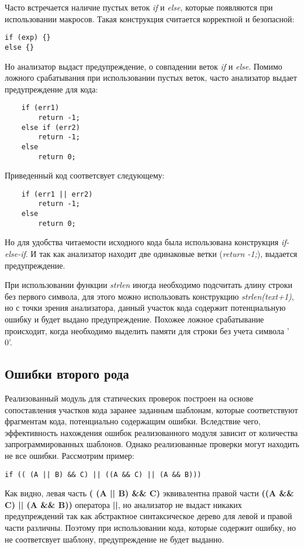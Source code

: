 Часто встречается наличие пустых веток \textit{if} и \textit{else}, которые появляются при использовании
макросов. Такая конструкция считается корректной и безопасной:
\begin{lstlisting}
if (exp) {} 
else {}
\end{lstlisting}
Но анализатор выдаст предупреждение, о совпадении веток \textit{if} и \textit{else}. Помимо 
ложного срабатывания при использовании пустых веток, часто анализатор выдает предупреждение для
кода:
\begin{lstlisting}
	if (err1)
		return -1;
	else if (err2)
		return -1;
	else
		return 0;
\end{lstlisting}
Приведенный код соответсвует следующему:
\begin{lstlisting}
	if (err1 || err2)
		return -1;
	else
		return 0;
\end{lstlisting}
Но для удобства читаемости исходного кода была использована конструкция \textit{if-else-if}. И так как
анализатор находит две одинаковые ветки (\textit{return -1;}), выдается предупреждение.
	
При использовании функции \textit{strlen} иногда необходимо подсчитать длину строки без первого
символа, для этого можно использовать конструкцию \textit{strlen(text+1)}, но с точки зрения анализатора,
данный участок кода содержит потенциальную ошибку и будет выдано предупреждение. Похожее ложное 
срабатывание происходит, когда необходимо выделить памяти для строки без учета символа '\\0'. 
	
\subsection*{Ошибки второго рода}
Реализованный модуль для статических проверок построен на основе сопоставления участков кода заранее
заданным шаблонам, которые соответствуют фрагментам кода, потенциально содержащим ошибки.
Вследствие чего, эффективность нахождения ошибок реализованного модуля зависит от количества запрограммированных шаблонов.
Однако реализованные проверки могут находить не все ошибки. Рассмотрим пример:
\begin{lstlisting}
if (( (A || B) && C) || ((A && C) || (A && B)))
\end{lstlisting}
Как видно, левая часть \textbf{( (A || B) \&\& C)} эквивалентна правой части \textbf{((A \&\& C) || (A \&\& B))}
оператора \textbf{||}, но анализатор не выдаст никаких предупреждений так как абстрактное синтаксическое дерево 
для левой и правой части различны. Поэтому при использовании кода, которые содержит ошибку, но не соответсвует шаблону,
предупреждение не будет выданно.
